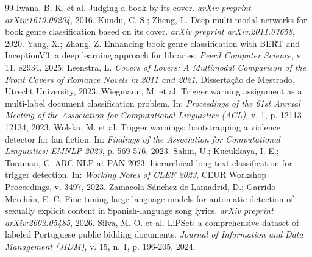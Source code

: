 \documentclass[12pt]{article}
\begin{document}
\begin{thebibliography}{99}
 Iwana, B. K. et al. Judging a book by its cover. \emph{arXiv preprint arXiv:1610.09204}, 2016.
 Kundu, C. S.; Zheng, L. Deep multi-modal networks for book genre classification based on its cover. \emph{arXiv preprint arXiv:2011.07658}, 2020.
 Yang, X.; Zhang, Z. Enhancing book genre classification with BERT and InceptionV3: a deep learning approach for libraries. \emph{PeerJ Computer Science}, v. 11, e2934, 2025.
 Leenstra, L. \emph{Covers of Lovers: A Multimodal Comparison of the Front Covers of Romance Novels in 2011 and 2021}. Dissertação de Mestrado, Utrecht University, 2023.
 Wiegmann, M. et al. Trigger warning assignment as a multi-label document classification problem. In: \emph{Proceedings of the 61st Annual Meeting of the Association for Computational Linguistics (ACL)}, v. 1, p. 12113-12134, 2023.
 Wolska, M. et al. Trigger warnings: bootstrapping a violence detector for fan fiction. In: \emph{Findings of the Association for Computational Linguistics: EMNLP 2023}, p. 569-576, 2023.
 Sahin, U.; Kucukkaya, I. E.; Toraman, C. ARC-NLP at PAN 2023: hierarchical long text classification for trigger detection. In: \emph{Working Notes of CLEF 2023}, CEUR Workshop Proceedings, v. 3497, 2023.
 Zamacola Sánchez de Lamadrid, D.; Garrido-Merchán, E. C. Fine-tuning large language models for automatic detection of sexually explicit content in Spanish-language song lyrics. \emph{arXiv preprint arXiv:2602.05485}, 2026.
 Silva, M. O. et al. LiPSet: a comprehensive dataset of labeled Portuguese public bidding documents. \emph{Journal of Information and Data Management (JIDM)}, v. 15, n. 1, p. 196-205, 2024.
\end{thebibliography}
\end{document}
